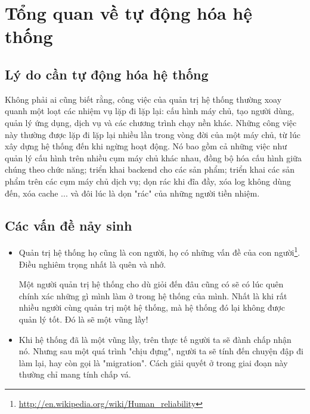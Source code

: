 \chapter{Tổng quan về tự động hóa hệ thống}
\newpage
\clearpage
\section{Lý do cần tự động hóa hệ thống}
Không phải ai cũng biết rằng, công việc của quản trị hệ thống thường xoay quanh một loạt các nhiệm vụ lặp đi lặp lại: cấu hình máy chủ, tạo người dùng, quản lý ứng dụng, dịch vụ và các chương trình chạy nền khác. Những công việc này thường được lặp đi lặp lại nhiều lần trong vòng đời của một máy chủ, từ lúc xây dựng hệ thống đến khi ngừng hoạt động. Nó bao gồm cả những việc như quản lý cấu hình trên nhiều cụm máy chủ khác nhau, đồng bộ hóa cấu hình giữa chúng theo chức năng; triển khai backend cho các sản phẩm; triển khai các sản phẩm trên các cụm máy chủ dịch vụ; dọn rác khi đĩa đầy, xóa log không dùng đến, xóa cache ... và đôi lúc là dọn "rác" của những người tiền nhiệm.

\newpage
\section{Các vấn đề nảy sinh}
\begin{itemize}
\item Quản trị hệ thống họ cũng là con người, họ có những vấn đề của con người\footnote{\url{http://en.wikipedia.org/wiki/Human_reliability}}. Điều nghiêm trọng nhất là quên và nhớ.

Một người quản trị hệ thống cho dù giỏi đến đâu cũng có sẽ có lúc quên chính xác những gì mình làm ở trong hệ thống của mình. Nhất là khi rất nhiều người cùng quản trị một hệ thống, mà hệ thống đó lại không được quản lý tốt. Đó là sẽ một vũng lầy!

\item Khi hệ thống đã là một vũng lầy, trên thực tế người ta sẽ đành chấp nhận nó. Nhưng sau một quá trình "chịu đựng", người ta sẽ tính đến chuyện đập đi làm lại, hay còn gọi là "migration". Cách giải quyết ở trong giai đoạn này thường chỉ mang tính chấp vá.

\end{itemize}


\newpage
